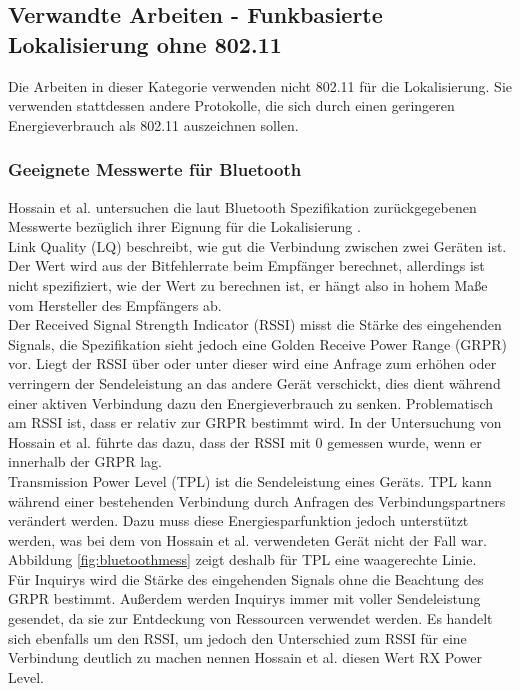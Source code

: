 \subsection{Verwandte Arbeiten - Funkbasierte Lokalisierung ohne 802.11}
Die Arbeiten in dieser Kategorie verwenden nicht 802.11 für die Lokalisierung.
Sie verwenden stattdessen andere Protokolle, die sich durch einen geringeren Energieverbrauch als 802.11 auszeichnen sollen.

\subsubsection{Geeignete Messwerte für Bluetooth}
Hossain et al. untersuchen die laut Bluetooth Spezifikation zurückgegebenen Messwerte bezüglich ihrer Eignung für die Lokalisierung \cite{hossain2007comprehensive}.\\ 
Link Quality (LQ) beschreibt, wie gut die Verbindung zwischen zwei Geräten ist.
Der Wert wird aus der Bitfehlerrate beim Empfänger berechnet, allerdings ist nicht spezifiziert, wie der Wert zu berechnen ist, er hängt also in hohem Maße vom Hersteller des Empfängers ab. \\
Der Received Signal Strength Indicator (RSSI) misst die Stärke des eingehenden Signals, die Spezifikation sieht jedoch eine Golden Receive Power Range (GRPR) vor. 
Liegt der RSSI über oder unter dieser wird eine Anfrage zum erhöhen oder verringern der Sendeleistung an das andere Gerät verschickt, dies dient während einer aktiven Verbindung dazu den Energieverbrauch zu senken.
Problematisch am RSSI ist, dass er relativ zur GRPR bestimmt wird.
In der Untersuchung von Hossain et al. führte das dazu, dass der RSSI mit 0 gemessen wurde, wenn er innerhalb der GRPR lag. \\
Transmission Power Level (TPL) ist die Sendeleistung eines Geräts. 
TPL kann während einer bestehenden Verbindung durch Anfragen des Verbindungspartners verändert werden.
Dazu muss diese Energiesparfunktion jedoch unterstützt werden, was bei dem von Hossain et al. verwendeten Gerät nicht der Fall war.
Abbildung \ref{fig:bluetoothmess} zeigt deshalb für TPL eine waagerechte Linie.\\
Für Inquirys wird die Stärke des eingehenden Signals ohne die Beachtung des GRPR bestimmt.
Außerdem werden Inquirys immer mit voller Sendeleistung gesendet, da sie zur Entdeckung von Ressourcen verwendet werden.
Es handelt sich ebenfalls um den RSSI, um jedoch den Unterschied zum RSSI für eine Verbindung deutlich zu machen nennen Hossain et al. diesen Wert RX Power Level.


